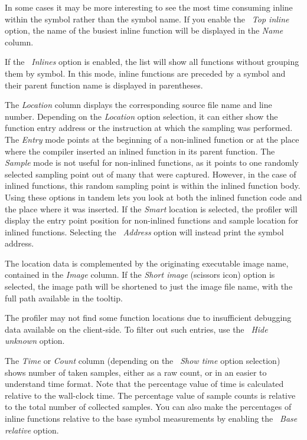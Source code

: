 \documentclass[hidelinks,titlepage,a4paper,twoside]{article}
\begin{document}
In some cases it may be more interesting to see the most time consuming inline within the symbol rather than the symbol name. If you enable the \emph{\faFire*~Top inline} option, the name of the busiest inline function will be displayed in the \emph{Name} column.

If the \emph{\faSitemap{}~Inlines} option is enabled, the list will show all functions without grouping them by symbol. In this mode, inline functions are preceded by a \faCaretRight{} symbol and their parent function name is displayed in parentheses.

The \emph{Location} column displays the corresponding source file name and line number. Depending on the \emph{Location} option selection, it can either show the function entry address or the instruction at which the sampling was performed. The \emph{Entry} mode points at the beginning of a non-inlined function or at the place where the compiler inserted an inlined function in its parent function. The \emph{Sample} mode is not useful for non-inlined functions, as it points to one randomly selected sampling point out of many that were captured. However, in the case of inlined functions, this random sampling point is within the inlined function body. Using these options in tandem lets you look at both the inlined function code and the place where it was inserted. If the \emph{Smart} location is selected, the profiler will display the entry point position for non-inlined functions and sample location for inlined functions. Selecting the \emph{\faAt{}~Address} option will instead print the symbol address.

The location data is complemented by the originating executable image name, contained in the \emph{Image} column. If the \emph{Short image} (scissors icon) option is selected, the image path will be shortened to just the image file name, with the full path available in the tooltip.

The profiler may not find some function locations due to insufficient debugging data available on the client-side. To filter out such entries, use the \emph{\faEyeSlash{}~Hide unknown} option.

The \emph{Time} or \emph{Count} column (depending on the \emph{\faStopwatch{}~Show time} option selection) shows number of taken samples, either as a raw count, or in an easier to understand time format. Note that the percentage value of time is calculated relative to the wall-clock time. The percentage value of sample counts is relative to the total number of collected samples. You can also make the percentages of inline functions relative to the base symbol measurements by enabling the \emph{\faLink{}~Base relative} option.
\end{document}

